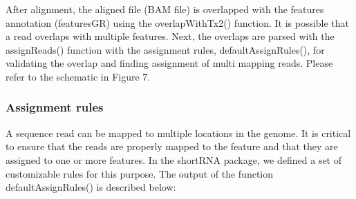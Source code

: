\documentclass[12pt,twoside]{reedthesis}
\begin{document}
After alignment, the aligned file (BAM file) is overlapped with the
features annotation (featuresGR) using the overlapWithTx2() function. It
is possible that a read overlaps with multiple features. Next, the
overlaps are parsed with the assignReads() function with the assignment
rules, defaultAssignRules(), for validating the overlap and finding
assignment of multi mapping reads. Please refer to the schematic in
Figure 7.

\hypertarget{assignment-rules}{%
\subsubsection{Assignment rules}\label{assignment-rules}}

A sequence read can be mapped to multiple locations in the genome. It is
critical to ensure that the reads are properly mapped to the feature and
that they are assigned to one or more features. In the shortRNA package,
we defined a set of customizable rules for this purpose. The output of
the function defaultAssignRules() is described below:
\end{document}
